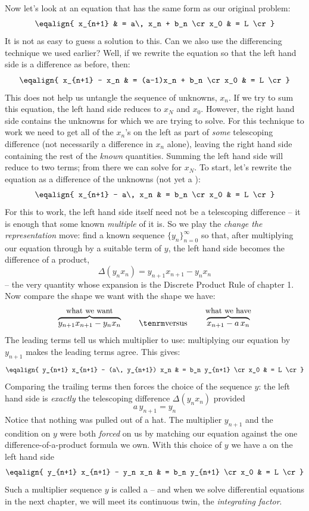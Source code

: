 Now let's look at an equation that has the same form as our original problem:
$$
\eqalign{
x_{n+1} & = a\, x_n + b_n \cr
x_0 & = L \cr
}
$$
It is not as easy to guess a solution to this.
Can we also use the differencing technique we used earlier? Well, if we rewrite 
the equation so that the left hand side is a difference as before, then:
$$
\eqalign{
x_{n+1} - x_n & = (a-1)x_n + b_n \cr
x_0 & = L \cr
}
$$
This does not help us untangle the sequence of unknowns, $x_n$. If we try to sum 
this equation, the left hand side reduces to $x_N$ and $x_0$. However, the right hand 
side contains the unknowns for which we are trying 
to solve. For this technique to work we need to get all of the $x_n$'s 
on the left as part of {\it some\/} telescoping difference (not necessarily a difference 
in $x_n$ alone), leaving the right hand side containing 
the rest of the {\it known\/} quantities. Summing the left hand side will reduce 
to two terms; from there we can solve for $x_N$. To start, let's 
rewrite the equation as a difference of the unknowns (not yet a ):
$$
\eqalign{
x_{n+1} - a\, x_n & = b_n \cr
x_0 & = L \cr
}
$$
For this to work, the left hand side itself need not be a telescoping
difference -- it is enough that some known {\it multiple\/} of it is.
So we play the {\it change the representation\/} move: find a known
sequence $\{y_n\}_{n=0}^\infty$ so that, after multiplying our equation
through by a suitable term of $y$, the left hand side becomes the
difference of a product,
$$
\Delta (y_n x_n) = y_{n+1} x_{n+1} - y_n x_n
$$
-- the very quantity whose expansion is the Discrete Product Rule of
chapter 1. Now compare the shape we want with the shape we have:
$$
\obrace{y_{n+1} x_{n+1} - y_n x_n}{what we want}
\qquad {\rm versus} \qquad
\obrace{x_{n+1} - a\, x_n}{what we have}
$$
The leading terms tell us which multiplier to use: multiplying our
equation by $y_{n+1}$ makes the leading terms agree. This gives:
$$
\eqalign{
y_{n+1} x_{n+1} - (a\, y_{n+1}) x_n & = b_n y_{n+1} \cr
x_0 & = L \cr
}
$$
Comparing the trailing terms then forces the choice of the sequence $y$: the left
hand side is {\it exactly\/} the telescoping difference $\Delta(y_n x_n)$ provided
$$
a\, y_{n+1} = y_n
$$
Notice that nothing was pulled out of a hat. The multiplier $y_{n+1}$ and
the condition on $y$ were both {\it forced\/} on us by matching our equation
against the one difference-of-a-product formula we own. With this choice of $y$ we have
a  on the left hand side
$$
\eqalign{
y_{n+1} x_{n+1} - y_n x_n & = b_n y_{n+1} \cr
x_0 & = L \cr
}
$$
Such a multiplier sequence $y$ is called a {\it {}\/} -- and
when we solve differential equations in the next chapter, we will meet its
continuous twin, the {\it integrating factor\/}.

